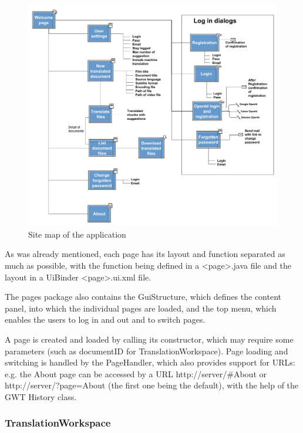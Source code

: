 \begin{figure}
\begin{center}
\includegraphics[scale=0.4]{figures/sitemap.pdf}
\end{center}
\caption{Site map of the application}
\label{fig:sitemap}
\end{figure}

As was already mentioned, each page has its layout and function separated as much as possible, with the function being defined in a <page>.java file and the layout in a UiBinder <page>.ui.xml file.

The pages package also contains the GuiStructure, which defines the content panel, into which the individual pages are loaded, and the top menu, which enables the users to log in and out and to switch pages.

A page is created and loaded by calling its constructor, which may require some parameters (such as documentID for TranslationWorkspace).
Page loading and switching is handled by the PageHandler, which also provides support for URLs: e.g. the About page can be accessed by a URL http://server/\#About or http://server/?page=About (the first one being the default), with the help of the GWT History class.

\subsubsection{TranslationWorkspace}

